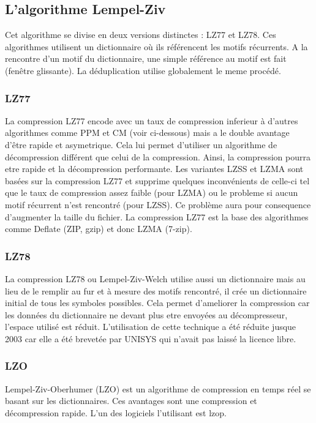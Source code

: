 \documentclass[a4paper]{report}
\begin{document}
	\subsection{L'algorithme Lempel-Ziv}
		Cet algorithme se divise en deux versions distinctes : LZ77 et LZ78. Ces algorithmes utilisent un dictionnaire où ils référencent les motifs récurrents. A la rencontre d'un motif du dictionnaire, une simple référence au motif est fait (fenêtre glissante). La déduplication utilise globalement le meme procédé.\\
	\subsubsection{LZ77}
		La compression LZ77 encode avec un taux de compression inferieur à d'autres algorithmes comme PPM et CM (voir ci-dessous) mais a le double avantage d'être rapide et asymetrique. Cela lui permet d'utiliser un algorithme de décompression différent que celui de la compression. Ainsi, la compression pourra etre rapide et la décompression performante. Les variantes LZSS et LZMA sont basées sur la compression LZ77 et supprime quelques inconvénients de celle-ci tel que le taux de compression assez faible (pour LZMA) ou le probleme si aucun motif récurrent n'est rencontré (pour LZSS). Ce problème aura pour consequence d'augmenter la taille du fichier. La compression LZ77 est la base des algorithmes comme Deflate (ZIP, gzip) et donc LZMA (7-zip).
	\subsubsection{LZ78}
		La compression LZ78 ou Lempel-Ziv-Welch utilise aussi un dictionnaire mais au lieu de le remplir au fur et à mesure des motifs rencontré, il crée un dictionnaire initial de tous les symboles possibles. Cela permet d'ameliorer la compression car les données du dictionnaire ne devant plus etre envoyées au décompresseur, l'espace utilisé est réduit. L'utilisation de cette technique a été réduite jusque 2003 car elle a été brevetée par UNISYS qui n'avait pas laissé la licence libre.
	\subsubsection{LZO}
		Lempel-Ziv-Oberhumer (LZO) est un algorithme de compression en temps réel se basant sur les dictionnaires. Ces avantages sont une compression et décompression rapide. L'un des logiciels l'utilisant est lzop.
\end{document}
